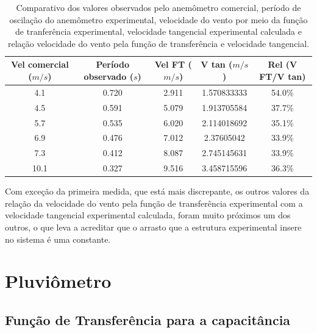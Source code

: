 \documentclass[a4paper]{instrumentacao}
\begin{document}
\begin{table}[H]
\centering
\caption{Comparativo dos valores observados pelo anemômetro comercial, período de oscilação do anemômetro experimental, velocidade do vento por meio da função de tranferência experimental, velocidade tangencial experimental calculada e relação velocidade do vento pela função de transferência e velocidade tangencial.}
\label{tab:anemometro-comparativo-vtf-vtan}
\begin{tabular}{|c|c|c|c|c|}
\hline
\textbf{Vel comercial ($m/s$)} & \textbf{Período observado ($s$)} & \textbf{Vel FT ($m/s$)} & \textbf{V tan ($m/s$)} & \textbf{Rel (V FT/V tan)} \\ \hline
4.1                           & 0.720                          & 2.911                  & 1.570833333           & 54.0\%                      \\ \hline
4.5                           & 0.591                          & 5.079                  & 1.913705584           & 37.7\%                      \\ \hline
5.7                           & 0.535                          & 6.020                  & 2.114018692           & 35.1\%                      \\ \hline
6.9                           & 0.476                          & 7.012                  & 2.37605042            & 33.9\%                      \\ \hline
7.3                           & 0.412                          & 8.087                  & 2.745145631           & 33.9\%                      \\ \hline
10.1                          & 0.327                          & 9.516                  & 3.458715596           & 36.3\%                      \\ \hline
\end{tabular}
\end{table}

Com exceção da primeira medida, que está mais discrepante, os outros valores da relação da velocidade do vento pela função de transferência experimental com a velocidade tangencial experimental calculada, foram muito próximos um dos outros, o que leva a acreditar que o arrasto que a estrutura experimental insere no sistema é uma constante.
\section{Pluviômetro}
\subsection{Função de Transferência para a capacitância}
\end{document}
